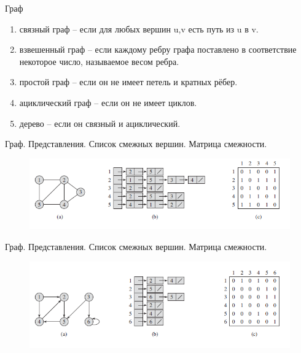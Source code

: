 \documentclass[newPxFont]{beamer}
\begin{document}
\begin{frame}{Граф}
\begin{enumerate}
\item связный граф -- если для любых вершин u,v есть путь из u в v.
\item взвешенный граф -- если каждому ребру графа поставлено в соответствие некоторое число, называемое весом ребра.
\item простой граф -- если он не имеет петель и кратных рёбер.
\item ациклический граф -- если он не имеет циклов.
\item дерево -- если он связный и ациклический.
\end{enumerate}
\end{frame}

\begin{frame}{Граф. Представления. Список смежных вершин. Матрица смежности.}
\begin{figure}
\centerline{\includegraphics[width=1.1\linewidth]{images/graphrep1.png}}
\end{figure}
\end{frame}

\begin{frame}{Граф. Представления. Список смежных вершин. Матрица смежности.}
\begin{figure}
\centerline{\includegraphics[width=1.1\linewidth]{images/graph_rep2.png}}
\end{figure}
\end{frame}
\end{document}
